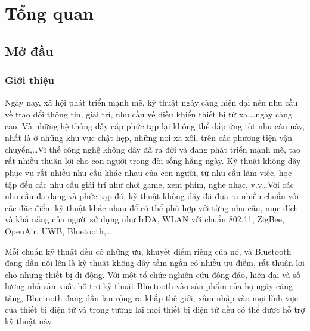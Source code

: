 
\chapter{Tổng quan}  %

\ifpdf
    \graphicspath{{Chapter1/Figs/Raster/}{Chapter1/Figs/PDF/}{Chapter1/Figs/}}
\else
    \graphicspath{{Chapter1/Figs/Vector/}{Chapter1/Figs/}}
\fi


\section{Mở đầu} %
\subsection{Giới thiệu}
Ngày nay, xã hội phát triển mạnh mẽ, kỹ thuật ngày càng hiện đại nên nhu cầu về trao đổi thông tin, giải trí, nhu cầu về điều khiển thiết bị từ xa,…ngày càng cao. Và những hệ thống dây cáp phức tạp lại không thể đáp ứng tốt nhu cầu này, nhất là ở những khu vực chật hẹp, những nơi xa xôi, trên các phương tiện vận chuyển,…Vì thế công nghệ không dây đã ra đời và đang phát triển mạnh mẽ, tạo rất nhiều thuận lợi cho con người trong đời sống hằng ngày. Kỹ thuật không dây phục vụ rất nhiều nhu cầu khác nhau của con người, từ nhu cầu làm việc, học tập đến các nhu cầu giải trí như chơi game, xem phim, nghe nhạc, v.v…Với các nhu cầu đa dạng và phức tạp đó, kỹ thuật không dây đã đưa ra nhiều chuẩn với các đặc điểm kỹ thuật khác nhau để có thể phù hợp với từng nhu cầu, mục đích và khả năng của người sử dụng như IrDA, WLAN với chuẩn 802.11, ZigBee, OpenAir, UWB, Bluetooth,…

Mỗi chuẩn kỹ thuật đều có những ưu, khuyết điểm riêng của nó, và Bluetooth đang dần nổi lên là kỹ thuật không dây tầm ngắn có nhiều ưu điểm, rất thuận lợi cho những thiết bị di động. Với một tổ chức nghiên cứu đông đảo, hiện đại và số lượng nhà sản xuất hỗ trợ kỹ thuật Bluetooth vào sản phẩm của họ ngày càng tăng, Bluetooth đang dần lan rộng ra khắp thế giới, xâm nhập vào mọi lĩnh vực của thiết bị điện tử và trong tương lai mọi thiết bị điện tử đều có thể được hỗ trợ kỹ thuật này.
